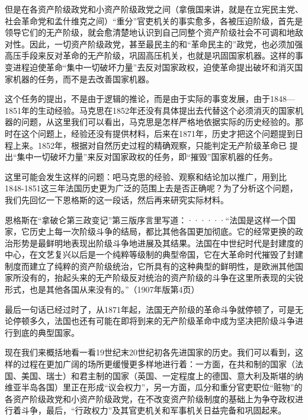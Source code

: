 但是在各资产阶级政党和小资产阶级政党之间（拿俄国来讲，就是在立宪民主党、社会革命党和孟什维克之间）“重分”官吏机关的事实愈多，各被压迫阶级，首先是领导它们的无产阶级，就会愈清楚地认识到自己同{\kaishu 整个}资产阶级社会不可调和地敌对性。因此，一切资产阶级政党，甚至最民主的和“革命民主的”政党，也必须加强高压手段来反对革命的无产阶级，巩固高压机关，也就是巩固国家机器。这样的事变进程迫使革命“集中一切破坏力量”去反对国家政权，迫使革命提出{\kaishu 破坏}和{\kaishu 消灭}国家机器的任务，而不是去改善国家机器。

这个任务的提出，不是由于逻辑的推论，而是由于实际的事变发展，由于1848—1851年的生动经验。马克思在1852年还没有具体提出去代替这个必须消灭的国家机器的问题，从这里我们可以看出，马克思是怎样严格地依据实际的历史经验的。那时在这个问题上，经验还没有提供材料，后来在1871年，历史才把这个问题提到日程上来。1852年，根据对自然历史过程的精确观察，只能判定无产阶级革命已 提出“集中一切破坏力量”来反对国家政权的任务，即“摧毁”国家机器的任务。

这里可能会发生这样的问题：吧马克思的经验、观察和结论加以推广，用到比1848-1851这三年法国历史更为广泛的范围上去是否正确呢？为了分析这个问题，我们先回忆一下恩格斯的这一段话，然后再来研究实际材料。

\pskip
\leftskip=10mm
\small

恩格斯在“拿破仑第三政变记”第三版序言里写道：······“法国是这样一个国家，它历史上每一次阶级斗争的结局，都比其他各国更加彻底。它的经常更换的政治形势是最鲜明地表现出阶级斗争地进展及其结果。法国在中世纪时代是封建度的中心，在文艺复兴以后是一个纯粹等级制的典型帝国，它在大革命时代摧毁了封建制度而建立了纯粹的资产阶级统治，它所具有的这种典型的鲜明性，是欧洲其他国家所没有的，抬起头来的无产阶级反对统治的资产阶级的斗争在这里所表现的尖锐形式，也是其他各国从来没有的。”（1907年版第4页）

\leftskip=0mm
\normalsize
\pskip

最后一句话已经过时了，从1871年起，法国无产阶级的革命斗争就停顿了，可是无论停顿多久，法国也还有可能在即将到来的无产阶级革命中成为坚决把阶级斗争进行到底的典型国家。

现在我们来概括地看一看19世纪末20世纪初各先进国家的历史。我们可以看到，这样的过程在更加广阔的场所更缓慢更多样地进行着：一方面，在共和制的国家（法国、美国、瑞士）和君主制的国家（英国、一定程度上的德国、意大利及斯堪的纳维亚半岛各国）里正在形成“议会权力”，另一方面，瓜分和重分官吏职位“赃物”的各资产阶级政党和小资产阶级政党，在不改变资产阶级制度的基础上为争夺政权进行着斗争，最后，“行政权力”及其官吏机关和军事机关日益完备和巩固起来。

